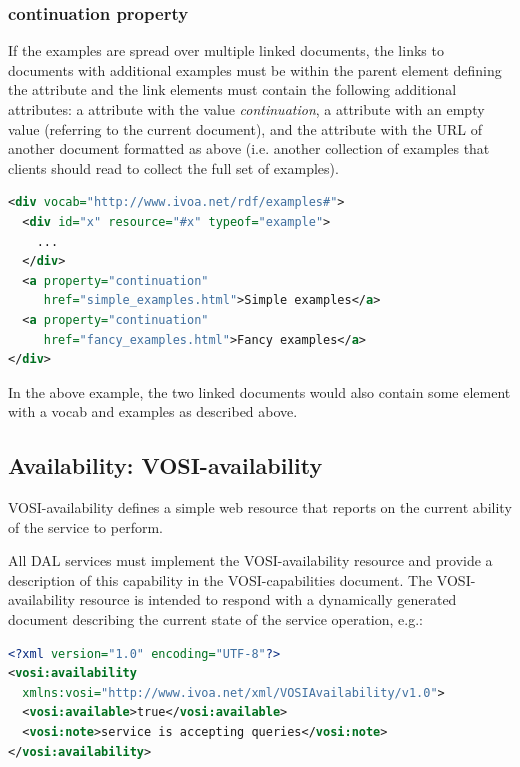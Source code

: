 \documentclass[11pt,letter]{ivoa}
\begin{document}
\subsubsection{continuation property}

If the examples are spread over multiple linked documents, the links to 
documents with additional examples must be within the parent element defining 
the  attribute and the link elements must contain the following additional 
attributes:  a  attribute with the value
\emph{continuation}, a 
attribute with an empty value (referring to the current document), and
the 
attribute with the URL of another document formatted as above (i.e. another 
collection of examples that clients should read to collect the full set of 
examples).

\begin{lstlisting}[language=XML,basicstyle=\footnotesize]
<div vocab="http://www.ivoa.net/rdf/examples#">
  <div id="x" resource="#x" typeof="example">
    ...
  </div>
  <a property="continuation"
     href="simple_examples.html">Simple examples</a>
  <a property="continuation"
     href="fancy_examples.html">Fancy examples</a>
</div>
\end{lstlisting}

In the above example, the two linked documents would also contain some element 
with a vocab and examples as described above. 

\subsection{Availability: VOSI-availability}
\label{sec:vosi-availability}
VOSI-availability \citep{std:VOSI} defines a simple web resource that 
reports on the current ability of the service to perform. 

All DAL services must implement the VOSI-availability resource and provide a description
of this capability in the VOSI-capabilities document. The VOSI-availability resource is
intended to respond with a dynamically generated document describing the current state of the service 
operation, e.g.:

\begin{lstlisting}[language=XML,basicstyle=\footnotesize]
<?xml version="1.0" encoding="UTF-8"?>
<vosi:availability  
  xmlns:vosi="http://www.ivoa.net/xml/VOSIAvailability/v1.0">
  <vosi:available>true</vosi:available>
  <vosi:note>service is accepting queries</vosi:note>
</vosi:availability>
\end{lstlisting}
\end{document}
